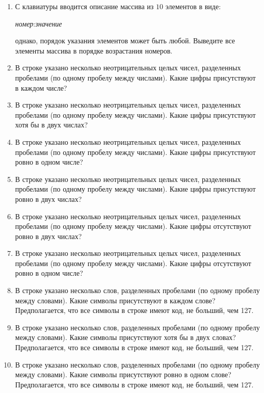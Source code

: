 \begin{enumerate}
\item С клавиатуры вводится описание массива из $10$ элементов в виде:

\textit{номер}:\textit{значение}

однако, порядок указания элементов может быть любой. Выведите все элементы
массива в порядке возрастания номеров.

\item В строке указано несколько неотрицательных целых чисел, разделенных пробелами (по одному
пробелу между числами). Какие цифры присутствуют в каждом числе?

\item В строке указано несколько неотрицательных целых чисел, разделенных пробелами (по одному
пробелу между числами). Какие цифры присутствуют хотя бы в двух числах?

\item В строке указано несколько неотрицательных целых чисел, разделенных пробелами (по одному
пробелу между числами). Какие цифры присутствуют ровно в одном числе?

\item В строке указано несколько неотрицательных целых чисел, разделенных пробелами (по одному
пробелу между числами). Какие цифры присутствуют ровно в двух числах?

\item В строке указано несколько неотрицательных целых чисел, разделенных пробелами (по одному
пробелу между числами). Какие цифры отсутствуют ровно в двух числах?

\item В строке указано несколько неотрицательных целых чисел, разделенных пробелами (по одному
пробелу между числами). Какие цифры отсутствуют ровно в одном числе?



\item В строке указано несколько слов, разделенных пробелами (по одному
пробелу между словами). Какие символы присутствуют в каждом слове? 
Предполагается, что все символы в строке имеют код, не больший, чем 127.

\item В строке указано несколько слов, разделенных пробелами (по одному
пробелу между словами). Какие символы присутствуют хотя бы в двух словах?
Предполагается, что все символы в строке имеют код, не больший, чем 127.


\item В строке указано несколько слов, разделенных пробелами (по одному
пробелу между словами). Какие символы присутствуют ровно в одном слове?
Предполагается, что все символы в строке имеют код, не больший, чем 127.



\end{enumerate}
